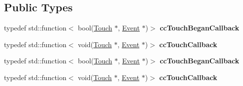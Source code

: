 \subsection*{Public Types}
\begin{DoxyCompactItemize}
\item 
\mbox{\label{classEventListenerTouchOneByOne_ab8591566b01274e0c6e6b45e196644f1}} 
typedef std\+::function$<$ bool(\hyperlink{classTouch}{Touch} $\ast$, \hyperlink{classEvent}{Event} $\ast$)$>$ {\bfseries cc\+Touch\+Began\+Callback}
\item 
\mbox{\label{classEventListenerTouchOneByOne_a0a07b4d8d60d5651bb29a44cca7ba38f}} 
typedef std\+::function$<$ void(\hyperlink{classTouch}{Touch} $\ast$, \hyperlink{classEvent}{Event} $\ast$)$>$ {\bfseries cc\+Touch\+Callback}
\item 
\mbox{\label{classEventListenerTouchOneByOne_ab8591566b01274e0c6e6b45e196644f1}} 
typedef std\+::function$<$ bool(\hyperlink{classTouch}{Touch} $\ast$, \hyperlink{classEvent}{Event} $\ast$)$>$ {\bfseries cc\+Touch\+Began\+Callback}
\item 
\mbox{\label{classEventListenerTouchOneByOne_a0a07b4d8d60d5651bb29a44cca7ba38f}} 
typedef std\+::function$<$ void(\hyperlink{classTouch}{Touch} $\ast$, \hyperlink{classEvent}{Event} $\ast$)$>$ {\bfseries cc\+Touch\+Callback}
\end{DoxyCompactItemize}
